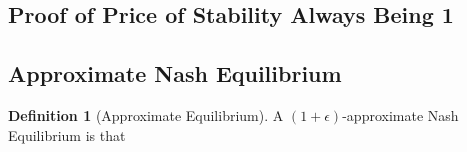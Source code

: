 \documentclass[11pt,psfig,times]{article}
\theoremstyle{theorem}
\theoremstyle{definition}
\newtheorem{definition}{Definition}[section]
\begin{document}
\subsection{Proof of Price of Stability Always Being 1}

\subsection{Approximate Nash Equilibrium}
\begin{definition}[Approximate Equilibrium]
	A \((1+\epsilon)\)-approximate Nash Equilibrium is that 
\end{definition}
\end{document}
